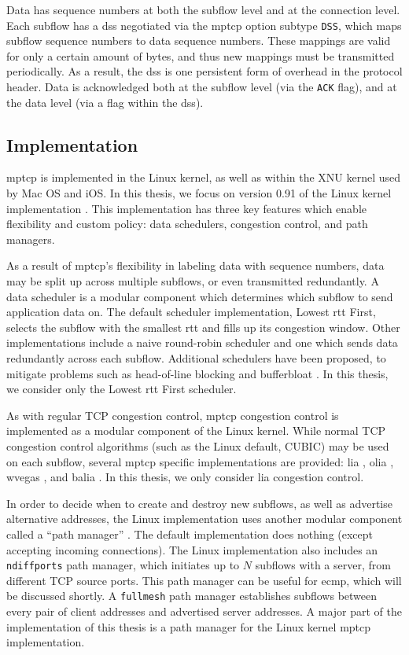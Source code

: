 \documentclass{cwru}
\begin{document}
Data has sequence numbers at both the subflow level and at the connection level.
Each subflow has a \ac{dss} negotiated via the \ac{mptcp} option subtype
\texttt{DSS}, which maps subflow sequence numbers to data sequence numbers.
These mappings are valid for only a certain amount of bytes, and thus new
mappings must be transmitted periodically. As a result, the \ac{dss} is one
persistent form of overhead in the protocol header. Data is acknowledged both
at the subflow level (via the \texttt{ACK} flag), and at the data level (via a
flag within the \ac{dss}).

\subsection{Implementation}

\ac{mptcp} is implemented in the Linux kernel, as well as within the XNU kernel
used by Mac OS and iOS. In this thesis, we focus on version 0.91 of the Linux
kernel implementation \cite{mptcp}. This implementation has three key features
which enable flexibility and custom policy: data schedulers, congestion control,
and path managers.

As a result of \ac{mptcp}'s flexibility in labeling data with sequence numbers,
data may be split up across multiple subflows, or even transmitted redundantly.
A data scheduler is a modular component which determines which subflow to send
application data on. The default scheduler implementation, Lowest \ac{rtt}
First, selects the subflow with the smallest \ac{rtt} and fills up its
congestion window. Other implementations include a naive round-robin scheduler
and one which sends data redundantly across each subflow. Additional schedulers
have been proposed, to mitigate problems such as head-of-line blocking and
bufferbloat \cite{paasch2014experimental}. In this thesis, we consider only the
Lowest \ac{rtt} First scheduler.

As with regular TCP congestion control, \ac{mptcp} congestion control is
implemented as a modular component of the Linux kernel. While normal TCP
congestion control algorithms (such as the Linux default, CUBIC) may be used on
each subflow, several \ac{mptcp} specific implementations are provided: \ac{lia}
\cite{rfc6356}, \ac{olia} \cite{draft-olia}, \ac{wvegas} \cite{draft-wvegas},
and \ac{balia} \cite{draft-balia}. In this thesis, we only consider \ac{lia}
congestion control.

In order to decide when to create and destroy new subflows, as well as advertise
alternative addresses, the Linux implementation uses another modular component
called a ``path manager'' \cite{mptcp}. The default implementation does nothing
(except accepting incoming connections). The Linux implementation also includes
an \texttt{ndiffports} path manager, which initiates up to $N$ subflows with a
server, from different TCP source ports. This path manager can be useful for
\ac{ecmp}, which will be discussed shortly. A \texttt{fullmesh} path manager
establishes subflows between every pair of client addresses and advertised
server addresses. A major part of the implementation of this thesis is a path
manager for the Linux kernel \ac{mptcp} implementation.
\end{document}
